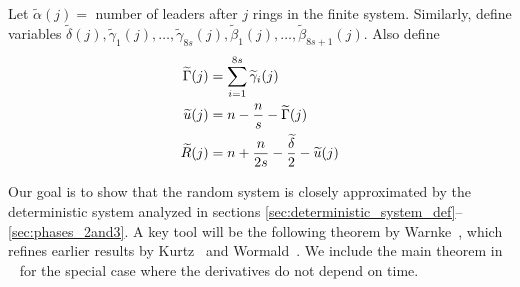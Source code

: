 \documentclass[a4paper,12pt]{article}
\begin{document}
Let $\widetilde{\alpha}(j) = $ number of leaders after $j$ rings in the finite system. Similarly, define variables $\widetilde{\delta}(j), \widetilde{\gamma}_1(j), \ldots, \widetilde{\gamma}_{8s}(j), \widetilde{\beta}_1(j), \ldots,  \widetilde{\beta}_{8s+1}(j)$. Also define
\begin{align}
\widetilde{\Gamma}(j) & = \sum_{i=1}^{8s} \widetilde{\gamma}_i(j) \notag \\
\widetilde{u}(j) & = n - \frac{n}{s} - \widetilde{\Gamma}(j) \notag \\
\widetilde{R}(j) & = n + \frac{n}{2s} - \frac{\widetilde{\delta}}{2} - \widetilde{u}(j) \notag
\end{align}

\medskip

Our goal is to show that the random system is closely approximated by the deterministic system analyzed in sections \ref{sec:deterministic_system_def}--\ref{sec:phases_2and3}. A key tool will be the following theorem by Warnke~\cite{warnke}, which refines earlier results by Kurtz~\cite{kurtz} and Wormald~\cite{wormald}. We include the main theorem in ~\cite{warnke} for the special case where the derivatives do not depend on time.
\end{document}
